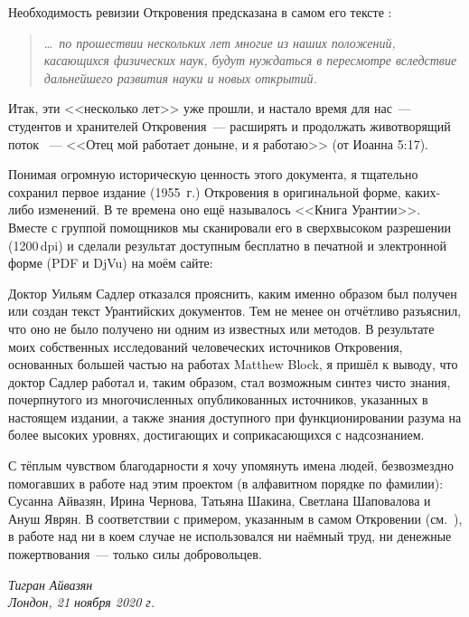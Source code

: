 Необходимость ревизии Откровения предсказана в самом его тексте :
\begin{quote}
\ldots\itshape\ по прошествии нескольких лет многие из наших положений, касающихся физических наук, будут нуждаться в пересмотре вследствие дальнейшего развития науки и новых открытий.
\end{quote}
Итак, эти <<несколько лет>> уже прошли, и настало время для нас~--- студентов и хранителей Откровения~--- расширять и
продолжать животворящий поток ~--- <<Отец мой работает доныне, и я работаю>> (от Иоанна 5:17).

Понимая огромную историческую ценность этого документа,
я тщательно сохранил первое издание (1955~г.) Откровения в оригинальной форме,  каких-либо изменений.
В те времена оно ещё называлось <<Книга Урантии>>.
Вместе с группой помощников мы сканировали его в сверхвысоком разрешении (1200\,dpi) и сделали результат доступным бесплатно
в печатной и электронной форме (PDF и DjVu) на моём сайте:

\begin{center}
\end{center}

Доктор Уильям Садлер отказался прояснить, каким именно образом был получен или создан текст Урантийских документов.
Тем не менее он отчётливо разъяснил, что оно не было получено ни одним из известных
 или  методов.
В результате моих собственных исследований человеческих источников Откровения, основанных большей частью
на работах Matthew Block, я пришёл к выводу, что доктор Садлер работал
 и, таким образом, стал возможным синтез чисто  знания,
почерпнутого из многочисленных опубликованных источников, указанных в настоящем издании,
а также знания 
доступного при функционировании разума на более высоких уровнях, достигающих и соприкасающихся с надсознанием.

С тёплым чувством благодарности я хочу упомянуть имена людей, безвозмездно помогавших в работе над этим проектом
(в алфавитном порядке по фамилии): Сусанна Айвазян, Ирина Чернова, Татьяна Шакина, Светлана Шаповалова и Ануш Яврян.
В соответствии с примером, указанным в самом Откровении (см.~), в работе над
 ни в коем случае не использовался ни наёмный труд, ни денежные пожертвования~--- только
силы добровольцев.


\begin{flushleft}
\itshape
Тигран Айвазян\\
Лондон, 21 ноября 2020 г.\\
\end{flushleft}
